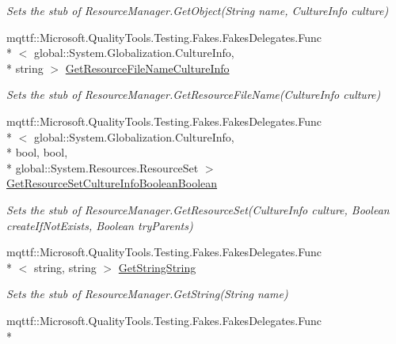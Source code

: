 \begin{DoxyCompactItemize}
\begin{DoxyCompactList}\small\item\em Sets the stub of Resource\-Manager.\-Get\-Object(\-String name, Culture\-Info culture)\end{DoxyCompactList}\item 
mqttf\-::\-Microsoft.\-Quality\-Tools.\-Testing.\-Fakes.\-Fakes\-Delegates.\-Func\\*
$<$ global\-::\-System.\-Globalization.\-Culture\-Info, \\*
string $>$ \hyperlink{class_system_1_1_component_model_1_1_fakes_1_1_stub_component_resource_manager_a96e05199447d4cad66267df54c5fb0ff}{Get\-Resource\-File\-Name\-Culture\-Info}
\begin{DoxyCompactList}\small\item\em Sets the stub of Resource\-Manager.\-Get\-Resource\-File\-Name(\-Culture\-Info culture)\end{DoxyCompactList}\item 
mqttf\-::\-Microsoft.\-Quality\-Tools.\-Testing.\-Fakes.\-Fakes\-Delegates.\-Func\\*
$<$ global\-::\-System.\-Globalization.\-Culture\-Info, \\*
bool, bool, \\*
global\-::\-System.\-Resources.\-Resource\-Set $>$ \hyperlink{class_system_1_1_component_model_1_1_fakes_1_1_stub_component_resource_manager_acdf047a0cdc7b6e95e771e73bfd9c1aa}{Get\-Resource\-Set\-Culture\-Info\-Boolean\-Boolean}
\begin{DoxyCompactList}\small\item\em Sets the stub of Resource\-Manager.\-Get\-Resource\-Set(\-Culture\-Info culture, Boolean create\-If\-Not\-Exists, Boolean try\-Parents)\end{DoxyCompactList}\item 
mqttf\-::\-Microsoft.\-Quality\-Tools.\-Testing.\-Fakes.\-Fakes\-Delegates.\-Func\\*
$<$ string, string $>$ \hyperlink{class_system_1_1_component_model_1_1_fakes_1_1_stub_component_resource_manager_ae0ccb0c1919cbe0ed40b0e29c109c640}{Get\-String\-String}
\begin{DoxyCompactList}\small\item\em Sets the stub of Resource\-Manager.\-Get\-String(\-String name)\end{DoxyCompactList}\item 
mqttf\-::\-Microsoft.\-Quality\-Tools.\-Testing.\-Fakes.\-Fakes\-Delegates.\-Func\\*

\end{DoxyCompactItemize}
